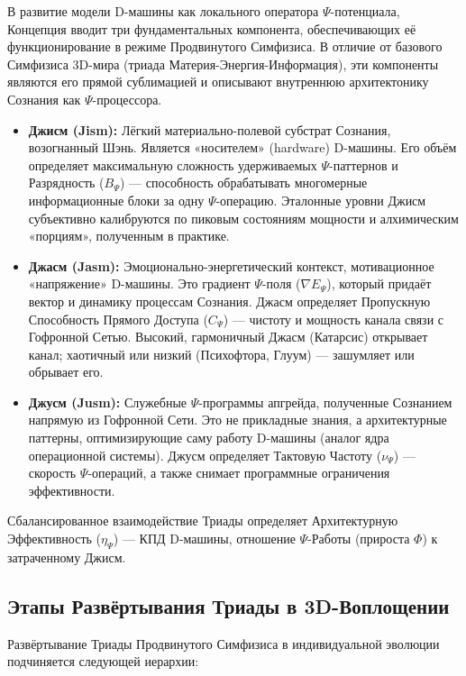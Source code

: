 \documentclass[a4paper,12pt]{article}
\begin{document}
В развитие модели D-машины как локального оператора $\Psi$-потенциала, Концепция вводит три фундаментальных компонента, обеспечивающих её функционирование в режиме Продвинутого Симфизиса. В отличие от базового Симфизиса 3D-мира (триада Материя-Энергия-Информация), эти компоненты являются его прямой сублимацией и описывают внутреннюю архитектонику Сознания как $\Psi$-процессора.

\begin{itemize}
	\item \textbf{Джисм (Jism):} Лёгкий материально-полевой субстрат Сознания, возогнанный Шэнь. Является «носителем» (hardware) D-машины. Его объём определяет максимальную сложность удерживаемых $\Psi$-паттернов и Разрядность ($B_{\Psi}$) — способность обрабатывать многомерные информационные блоки за одну $\Psi$-операцию. Эталонные уровни Джисм субъективно калибруются по пиковым состояниям мощности и алхимическим «порциям», полученным в практике.
	
	\item \textbf{Джасм (Jasm):} Эмоционально-энергетический контекст, мотивационное «напряжение» D-машины. Это градиент $\Psi$-поля ($\nabla E_{\Psi}$), который придаёт вектор и динамику процессам Сознания. Джасм определяет Пропускную Способность Прямого Доступа ($C_{\Psi}$) — чистоту и мощность канала связи с Гофронной Сетью. Высокий, гармоничный Джасм (Катарсис) открывает канал; хаотичный или низкий (Психофтора, Глуум) — зашумляет или обрывает его.
	
	\item \textbf{Джусм (Jusm):} Служебные $\Psi$-программы апгрейда, полученные Сознанием напрямую из Гофронной Сети. Это не прикладные знания, а архитектурные паттерны, оптимизирующие саму работу D-машины (аналог ядра операционной системы). Джусм определяет Тактовую Частоту ($\nu_{\Psi}$) — скорость $\Psi$-операций, а также снимает программные ограничения эффективности.
\end{itemize}

Сбалансированное взаимодействие Триады определяет Архитектурную Эффективность ($\eta_{\Psi}$) — КПД D-машины, отношение $\Psi$-Работы (прироста $\Phi$) к затраченному Джисм.

\subsection{Этапы Развёртывания Триады в 3D-Воплощении}

Развёртывание Триады Продвинутого Симфизиса в индивидуальной эволюции подчиняется следующей иерархии:
\end{document}
